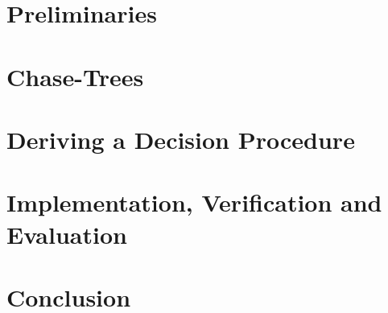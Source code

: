 \documentclass[12pt]{article}
\begin{document}
\newpage
\section{Preliminaries}

\newpage
\section{Chase-Trees}

\newpage
\section{Deriving a Decision Procedure}

\newpage
\section{Implementation, Verification and Evaluation}

\newpage
\section{Conclusion}

\printbibliography
\end{document}
